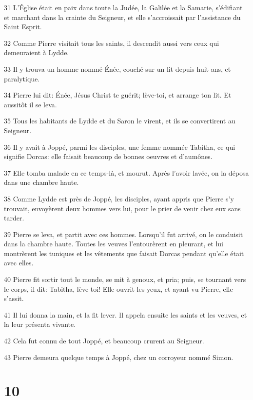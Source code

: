 \par 31 L'Église était en paix dans toute la Judée, la Galilée et la Samarie, s'édifiant et marchant dans la crainte du Seigneur, et elle s'accroissait par l'assistance du Saint Esprit.
\par 32 Comme Pierre visitait tous les saints, il descendit aussi vers ceux qui demeuraient à Lydde.
\par 33 Il y trouva un homme nommé Énée, couché sur un lit depuis huit ans, et paralytique.
\par 34 Pierre lui dit: Énée, Jésus Christ te guérit; lève-toi, et arrange ton lit. Et aussitôt il se leva.
\par 35 Tous les habitants de Lydde et du Saron le virent, et ils se convertirent au Seigneur.
\par 36 Il y avait à Joppé, parmi les disciples, une femme nommée Tabitha, ce qui signifie Dorcas: elle faisait beaucoup de bonnes oeuvres et d'aumônes.
\par 37 Elle tomba malade en ce temps-là, et mourut. Après l'avoir lavée, on la déposa dans une chambre haute.
\par 38 Comme Lydde est près de Joppé, les disciples, ayant appris que Pierre s'y trouvait, envoyèrent deux hommes vers lui, pour le prier de venir chez eux sans tarder.
\par 39 Pierre se leva, et partit avec ces hommes. Lorsqu'il fut arrivé, on le conduisit dans la chambre haute. Toutes les veuves l'entourèrent en pleurant, et lui montrèrent les tuniques et les vêtements que faisait Dorcas pendant qu'elle était avec elles.
\par 40 Pierre fit sortir tout le monde, se mit à genoux, et pria; puis, se tournant vers le corps, il dit: Tabitha, lève-toi! Elle ouvrit les yeux, et ayant vu Pierre, elle s'assit.
\par 41 Il lui donna la main, et la fit lever. Il appela ensuite les saints et les veuves, et la leur présenta vivante.
\par 42 Cela fut connu de tout Joppé, et beaucoup crurent au Seigneur.
\par 43 Pierre demeura quelque temps à Joppé, chez un corroyeur nommé Simon.

\chapter{10}

